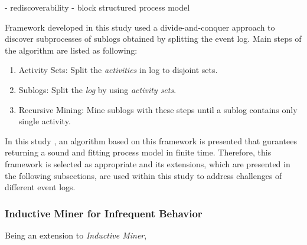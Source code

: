 - rediscoverability
- block structured process model  
 
Framework developed in this study used a divide-and-conquer approach to discover subprocesses of sublogs obtained by splitting the event log. Main steps of the algorithm are listed as following:

\begin{enumerate}
  \item Activity Sets: Split the \textit{activities} in log to disjoint sets.
  \item Sublogs: Split the \textit{log} by using \textit{activity sets}.
  \item Recursive Mining: Mine sublogs with these steps until a sublog contains only single activity.
\end{enumerate}

In this study \cite{leemans2013discovering}, an algorithm based on this framework is presented that gurantees returning a sound and fitting process model in finite time. Therefore, this framework is selected as appropriate and its extensions, which are presented in the following subsections, are used within this study to address challenges of different event logs.

\subsubsection{Inductive Miner for Infrequent Behavior}
\label{sec:inductive-miner-infrequent}
\cite{leemans2014discoveringinfrequent}
Being an extension to \textit{Inductive Miner}, 


